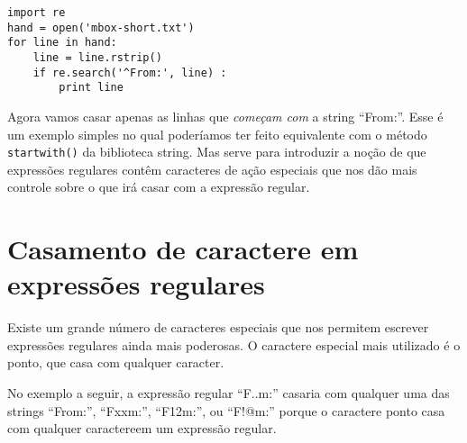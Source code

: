 \beforeverb
\begin{verbatim}
import re
hand = open('mbox-short.txt')
for line in hand:
    line = line.rstrip()
    if re.search('^From:', line) :
        print line
\end{verbatim}
\afterverb
%

Agora vamos casar apenas as linhas que {\em começam com} a string ``From:''. Esse é um exemplo 
simples no qual poderíamos ter feito equivalente com o método {\tt startwith()} da biblioteca 
string. Mas serve para introduzir a noção de que expressões regulares contêm caracteres de ação 
especiais que nos dão mais controle sobre o que irá casar com a expressão regular.

\section{Casamento de caractere em expressões regulares}

Existe um grande número de caracteres especiais que nos permitem escrever expressões regulares
ainda mais poderosas. O caractere especial mais utilizado é o ponto, que casa com qualquer caracter.


No exemplo a seguir, a expressão regular ``F..m:'' casaria com qualquer uma das strings
``From:'', ``Fxxm:'', ``F12m:'', ou ``F!@m:'' porque o caractere ponto casa com qualquer
caractereem um expressão regular.

